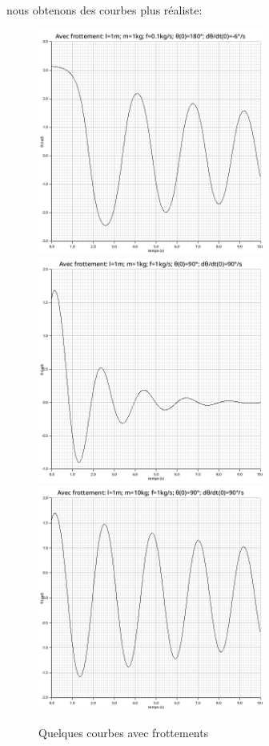 \documentclass{article}
\begin{document}
{{      nous obtenons des courbes plus réaliste:
      \begin{figure}[H]
        \centering
        \includegraphics[width=20em]{images/pendule_friction_180_vi.png}
        \includegraphics[width=20em]{images/pendule_friction_90_f_vi.png}
        \includegraphics[width=20em]{images/pendule_friction_90_vi_f_m.png}
        \caption{Quelques courbes avec frottements}
      \end{figure}

}}
\end{document}
